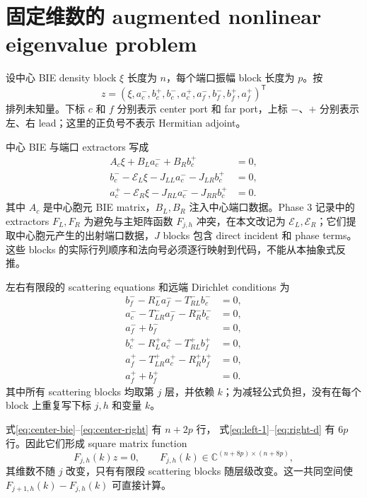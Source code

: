 \documentclass[UTF8,fontset=fandol,11pt,a4paper]{ctexart}
\begin{document}
\section{固定维数的 augmented nonlinear eigenvalue problem}

设中心 BIE density block $\xi$ 长度为 $n$，每个端口振幅 block 长度为 $p$。按
\[
  z=(\xi,a_c^-,b_c^+,b_c^-,a_c^+,a_f^-,b_f^-,b_f^+,a_f^+)^{\mathsf T}
\]
排列未知量。下标 $c$ 和 $f$ 分别表示 center port 和 far port，上标 $-$、$+$
分别表示左、右 lead；这里的正负号不表示 Hermitian adjoint。

中心 BIE 与端口 extractors 写成
\begin{align}
  A_c\xi+B_La_c^-+B_Rb_c^+&=0,\label{eq:center-bie}\\
  b_c^- -\mathcal E_L\xi-J_{LL}a_c^- -J_{LR}b_c^+&=0,\label{eq:center-left}\\
  a_c^+ -\mathcal E_R\xi-J_{RL}a_c^- -J_{RR}b_c^+&=0.\label{eq:center-right}
\end{align}
其中 $A_c$ 是中心胞元 BIE matrix，$B_L,B_R$ 注入中心端口数据。Phase 3 记录中的
extractors $F_L,F_R$ 为避免与主矩阵函数 $F_{j,h}$ 冲突，在本文改记为
$\mathcal E_L,\mathcal E_R$；它们提取中心胞元产生的出射端口数据，$J$ blocks 包含
direct incident 和 phase terms。
这些 blocks 的实际行列顺序和法向号必须逐行映射到代码，不能从本抽象式反推。

左右有限段的 scattering equations 和远端 Dirichlet conditions 为
\begin{align}
  b_f^- -R_L^-a_f^- -T_{RL}^-b_c^-&=0,\label{eq:left-1}\\
  a_c^- -T_{LR}^-a_f^- -R_R^-b_c^-&=0,\label{eq:left-2}\\
  a_f^-+b_f^-&=0,\label{eq:left-d}\\
  b_c^+ -R_L^+a_c^+ -T_{RL}^+b_f^+&=0,\label{eq:right-1}\\
  a_f^+ -T_{LR}^+a_c^+ -R_R^+b_f^+&=0,\label{eq:right-2}\\
  a_f^++b_f^+&=0.\label{eq:right-d}
\end{align}
其中所有 scattering blocks 均取第 $j$ 层，并依赖 $k$；为减轻公式负担，没有在每个
block 上重复写下标 $j,h$ 和变量 $k$。

式\eqref{eq:center-bie}--\eqref{eq:center-right} 有 $n+2p$ 行，
式\eqref{eq:left-1}--\eqref{eq:right-d} 有 $6p$ 行。因此它们形成 square matrix
function
\[
  F_{j,h}(k)z=0,
  \qquad
  F_{j,h}(k)\in\mathbb C^{(n+8p)\times(n+8p)},
\]
其维数不随 $j$ 改变，只有有限段 scattering blocks 随层级改变。这一共同空间使
$F_{j+1,h}(k)-F_{j,h}(k)$ 可直接计算。
\end{document}
